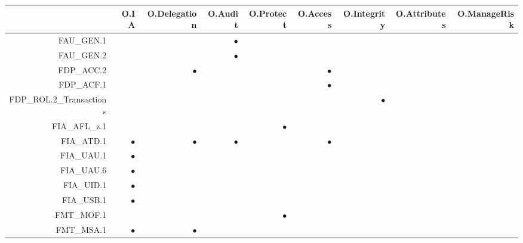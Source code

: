 \documentclass[12pt,english]{scrbook}
\newcommand{\oh}{$\bullet$}
\begin{document}
\begin{longtable}{r|R|R|R|R|R|R|R|R}
        \toprule
                            & O.IA & O.Delegation & O.Audit & O.Protect & O.Access & O.Integrity & O.Attributes & O.ManageRisk \\
        \midrule\endhead

FAU\_GEN.1                  &      &              & \oh     &           &          &             &              &              \\
FAU\_GEN.2                  &      &              & \oh     &           &          &             &              &              \\
FDP\_ACC.2                  &      & \oh          &         &           & \oh      &             &              &              \\
FDP\_ACF.1                  &      &              &         &           &  \oh     &             &              &              \\
FDP\_ROL.2\_Transactions    &      &              &         &           &          &   \oh       &              &              \\
FIA\_AFL\_z.1               &      &              &         &   \oh     &          &             &              &              \\
FIA\_ATD.1                  & \oh  &  \oh         &   \oh   &           & \oh      &             &              &              \\
FIA\_UAU.1                  & \oh  &              &         &           &          &             &              &              \\
FIA\_UAU.6                  & \oh  &              &         &           &          &             &              &              \\
FIA\_UID.1                  & \oh  &              &         &           &          &             &              &              \\
FIA\_USB.1                  & \oh  &              &         &           &          &             &              &              \\
FMT\_MOF.1                  &      &              &         &  \oh      &          &             &              &              \\
FMT\_MSA.1                  & \oh  &  \oh         &         &           &          &             &              &              \\

\end{longtable}
\end{document}

